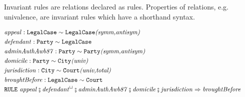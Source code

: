 \documentclass[runningheads,a4paper]{llncs}
\def\id#1{\text{\em #1\/}}
\def\relid#1{\ifthenelse{\equal{#1}{r}
                      \or\equal{#1}{s}
                      \or\equal{#1}{t}
                      \or\equal{#1}{R}
                      \or\equal{#1}{S}
                      \or\equal{#1}{T}}{#1}
                                       {\id{#1}}}
\def\cpt#1{\ifthenelse{\equal{#1}{A}
                    \or\equal{#1}{B}
                    \or\equal{#1}{C}}{#1}
                                     {\text{\tt #1\/}}}
\newcommand{\type}[2]{\cpt{#1}\sim\cpt{#2}}
\newcommand{\declare}[3]{\relid{#1}:\type{#2}{#3}}
\newcommand{\sflip}[1]{{#1}^\sqcup}
\newcommand{\scompose}{\comp}
\def\comp{\mathrel{\raise 0.66ex\hbox{\oalign{\hfil%
	  $\scriptscriptstyle\mathsf{o}$\hfil%
	  \cr\hfil$\scriptscriptstyle\mathsf{9}$\hfil}}}}
\newcommand{\simplic}{\Rightarrow}
\begin{document}
Invariant rules are relations declared as rules.
Properties of relations, e.g. univalence, are invariant rules which have a shorthand syntax.

\begin{eqnarray}
	&\declare{appeal}{LegalCase}{LegalCase}\id{(symm,antisym)} \\
	&\declare{defendant}{Party}{LegalCase} \\
	&\declare{adminAuthAwb87}{Party}{Party}\id{(symm,antisym)} \\
	&\declare{domicile}{Party}{City}\id{(univ)} \\
	&\declare{jurisdiction}{City}{Court}\id{(univ,total)} \\
	&\declare{broughtBefore}{LegalCase}{Court} \\
	&\cpt{RULE}\ \relid{appeal}\scompose\sflip{\relid{defendant}}\scompose\relid{adminAuthAwb87}\scompose\relid{domicile}\scompose\relid{jurisdiction}\simplic\relid{broughtBefore}\phantom{xxxx}
\end{eqnarray}
\end{document}
